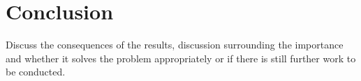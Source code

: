 \section{Conclusion} \label{sec:conclusion}
\color{red}
Discuss the consequences of the results, discussion surrounding the importance and whether it solves the problem appropriately or if there is still further work to be conducted.
\color{black}
